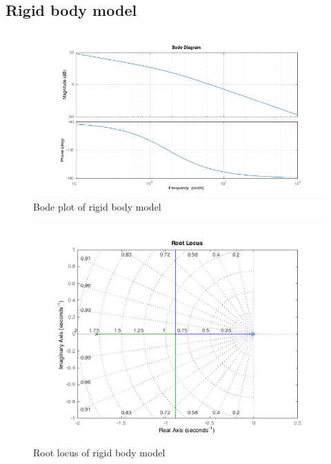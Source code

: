 \documentclass[a4paper, 12pt]{article}
\begin{document}
\subsection{Rigid body model}
\begin{figure}[!h]
\centering
\includegraphics[width = 0.9\linewidth]{BodePlot}
\caption{Bode plot of rigid body model}
\label{BodePlot}
\end{figure}
\begin{figure}[!h]
\centering
\includegraphics[width = 0.9\linewidth]{rLocus}
\caption{Root locus of rigid body model}
\label{rLocus}
\end{figure}

\end{document}
